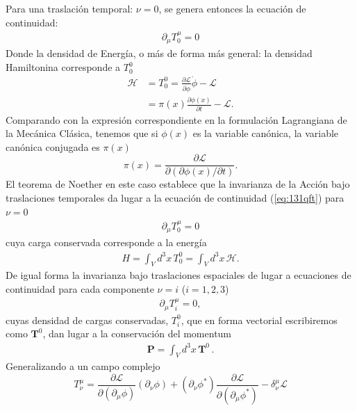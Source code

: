 Para una traslación temporal: $\nu=0$, se genera entonces la ecuación de continuidad:
\begin{align}
  \partial_\mu T^\mu_0=0
\end{align}
Donde la densidad de Energía, o más de forma más general: la densidad Hamiltonina corresponde a $T^0_0$
\begin{align}
  \label{eq:3qft}
\mathcal{H}&=T^0_0=\frac{\partial\mathcal{L}}{\partial\dot{\phi}}\dot{\phi}
      -\mathcal{L}\\
      &=\pi(x)\frac{\partial\phi(x)}{\partial t}-\mathcal{L}.
\end{align}
Comparando con la expresión correspondiente en la formulación
Lagrangiana de la Mecánica Clásica, tenemos que si $\phi(x)$ es la
variable canónica, la variable canónica conjugada es $\pi(x)$
\begin{equation}
  \label{eq:4qft}
  \pi(x)=\frac{\partial\mathcal{L}}{\partial(\partial\phi(x)/\partial t)}.
\end{equation}
El teorema de Noether en este caso establece que la invarianza de la Acción bajo traslaciones temporales da lugar a la ecuación de continuidad (\ref{eq:131qft}) para $\nu=0$
\begin{align}
\label{eq:122qft}
  \partial_\mu T^\mu_0=0
\end{align}
cuya carga conservada corresponde a la energía
\begin{align}
  H=\int_V d^3x\, T^0_0=\int_V d^3x\,\mathcal{H}.
\end{align}
De igual forma la invarianza bajo traslaciones espaciales de lugar a ecuaciones de continuidad para cada componente $\nu=i$
 ($i=1,2,3$)
 \begin{align}
   \label{eq:235qft}
   \partial_\mu T^\mu_i=0,
 \end{align}
cuyas densidad de cargas conservadas, $T^0_i$, que en forma vectorial escribiremos como $\mathbf{T}^0$, dan lugar a la conservación del momentum
\begin{align}
  \mathbf{P}=\int_V d^3x\,\mathbf{T}^0\,.
\end{align}
Generalizando a un campo complejo
\begin{equation}
  \label{eq:138qft}
     T^\mu_\nu=\frac{\partial\mathcal{L}}{\partial(\partial_\mu\phi)}(\partial_\nu\phi)+(\partial_\nu\phi^*)\frac{\partial\mathcal{L}}{\partial(\partial_\mu\phi^*)}
      -\delta^\mu_\nu\mathcal{L}
\end{equation}


